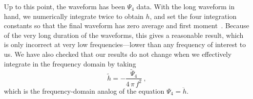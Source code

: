 Up to this point, the waveform has been $\Psi_{4}$ data.  With the
long waveform in hand, we numerically integrate twice to obtain $h$,
and set the four integration constants so that the final waveform has
zero average and first moment~\cite{Pfeiffer-Brown-etal:2007}.
Because of the very long duration of the waveforms, this gives a
reasonable result, which is only incorrect at very low
frequencies---lower than any frequency of interest to us.  We have
also checked that our results do not change when we effectively
integrate in the frequency domain by taking
\begin{equation}
  \label{eq:PsiFourIntegration}
  \tilde{h} = -\frac{\tilde{\Psi}_{4}}{4\,\pi\, f^{2}}\ ,
\end{equation}
which is the frequency-domain analog of the equation $\Psi_{4} =
\ddot{h}$.

